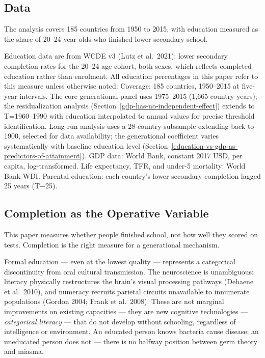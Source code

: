 \documentclass[12pt,letterpaper]{article}
\begin{document}
\subsection{Data}\label{data}

The analysis covers 185 countries from 1950 to 2015, with education measured as the share of 20--24-year-olds who finished lower secondary school.

Education data are from WCDE v3 (Lutz et al.~2021): lower secondary
completion rates for the 20--24 age cohort, both sexes, which reflects
completed education rather than enrolment. All education percentages in
this paper refer to this measure unless otherwise noted. Coverage: 185
countries, 1950--2015 at five-year intervals.
The core generational
panel uses 1975--2015 (1,665 country-years); the residualization
analysis (Section~\ref{gdp-has-no-independent-effect}) extends to T=1960--1990 with education
interpolated to annual values for precise threshold identification.
Long-run analysis uses a 28-country subsample extending back to 1900,
selected for data availability; the generational coefficient varies
systematically with baseline education level (Section~\ref{education-vs-gdp-as-predictors-of-attainment}). GDP data:
World Bank, constant 2017 USD, per capita, log-transformed. Life
expectancy, TFR, and under-5 mortality: World Bank WDI. Parental
education: each country's lower secondary completion lagged 25 years
(T−25).

\subsection{Completion as the Operative Variable}\label{completion-as-the-operative-variable}

This paper measures whether people finished school, not how well they
scored on tests. Completion is the right measure for a generational
mechanism.

Formal education --- even at the lowest quality --- represents a
categorical discontinuity from oral cultural transmission. The
neuroscience is unambiguous: literacy physically restructures the brain's
visual processing pathways (Dehaene et al.~2010), and numeracy recruits
parietal circuits unavailable to innumerate populations (Gordon 2004;
Frank et al.~2008). These are not marginal improvements on existing
capacities --- they are new cognitive technologies ---
\emph{categorical literacy} --- that do not develop without schooling,
regardless of intelligence or environment. An educated person knows
bacteria cause disease; an uneducated person does not --- there is no
halfway position between germ theory and miasma.
\end{document}
